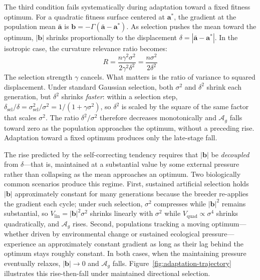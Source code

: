 \documentclass[9pt,twocolumn,twoside,lineno]{gsajnl}
\newcommand{\vect}[1]{\boldsymbol{#1}}
\newcommand{\Ag}{\ensuremath{\mathcal{A}_{g}}\xspace}
\begin{document}
The third condition fails systematically during adaptation toward a fixed fitness optimum. For a quadratic fitness surface centered at $\vect{a}^*$, the gradient at the population mean $\bar{\vect{a}}$ is $\vect{b} = -\Gamma(\bar{\vect{a}} - \vect{a}^*)$. As selection pushes the mean toward the optimum, $|\vect{b}|$ shrinks proportionally to the displacement $\delta = |\bar{\vect{a}} - \vect{a}^*|$. In the isotropic case, the curvature relevance ratio becomes:
\begin{equation}
R = \frac{n\gamma^2\sigma^2}{2\gamma^2\delta^2} = \frac{n\sigma^2}{2\delta^2}
\label{eq:R-displacement}
\end{equation}
The selection strength $\gamma$ cancels. What matters is the ratio of variance to squared displacement. Under standard Gaussian selection, both $\sigma^2$ and $\delta^2$ shrink each generation, but $\delta^2$ shrinks \emph{faster}: within a selection step, $\delta_{\mathrm{sel}}/\delta = \sigma^2_{\mathrm{sel}}/\sigma^2 = 1/(1 + \gamma\sigma^2)$, so $\delta^2$ is scaled by the square of the same factor that scales $\sigma^2$. The ratio $\delta^2/\sigma^2$ therefore decreases monotonically and \Ag falls toward zero as the population approaches the optimum, without a preceding rise. Adaptation toward a fixed optimum produces only the late-stage fall.

The rise predicted by the self-correcting tendency requires that $|\vect{b}|$ be \emph{decoupled} from $\delta$---that is, maintained at a substantial value by some external pressure rather than collapsing as the mean approaches an optimum. Two biologically common scenarios produce this regime. First, sustained artificial selection holds $|\vect{b}|$ approximately constant for many generations because the breeder re-applies the gradient each cycle; under such selection, $\sigma^2$ compresses while $|\vect{b}|^2$ remains substantial, so $V_{\mathrm{lin}} = |\vect{b}|^2 \sigma^2$ shrinks linearly with $\sigma^2$ while $V_{\mathrm{quad}} \propto \sigma^4$ shrinks quadratically, and \Ag rises. Second, populations tracking a moving optimum---whether driven by environmental change or sustained ecological pressure---experience an approximately constant gradient as long as their lag behind the optimum stays roughly constant. In both cases, when the maintaining pressure eventually relaxes, $|\vect{b}| \to 0$ and \Ag falls. Figure~\ref{fig:adaptation-trajectory} illustrates this rise-then-fall under maintained directional selection.
\end{document}
